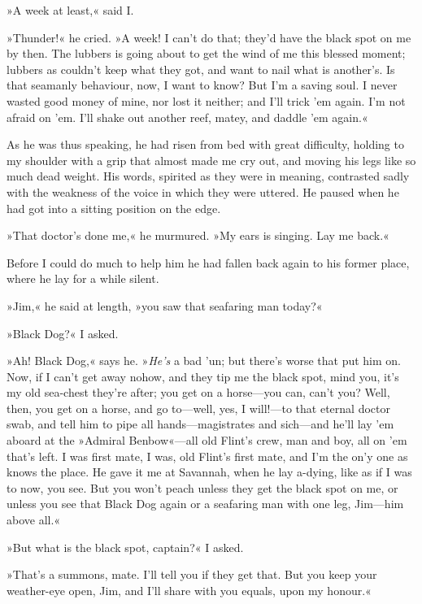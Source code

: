 »A week at least,« said I.

»Thunder!« he cried. »A week! I can't do that; they'd have the black spot on me by then. The lubbers is going about to get the wind of me this blessed moment; lubbers as couldn't keep what they got, and want to nail what is another's. Is that seamanly behaviour, now, I want to know? But I'm a saving soul. I never wasted good money of mine, nor lost it neither; and I'll trick 'em again. I'm not afraid on 'em. I'll shake out another reef, matey, and daddle 'em again.«

As he was thus speaking, he had risen from bed with great difficulty, holding to my shoulder with a grip that almost made me cry out, and moving his legs like so much dead weight. His words, spirited as they were in meaning, contrasted sadly with the weakness of the voice in which they were uttered. He paused when he had got into a sitting position on the edge.

»That doctor's done me,« he murmured. »My ears is singing. Lay me back.«

Before I could do much to help him he had fallen back again to his former place, where he lay for a while silent.

»Jim,« he said at length, »you saw that seafaring man today?«

»Black Dog?« I asked.

»Ah! Black Dog,« says he. »\textit{He's} a bad 'un; but there's worse that put him on. Now, if I can't get away nohow, and they tip me the black spot, mind you, it's my old sea-chest they're after; you get on a horse—you can, can't you? Well, then, you get on a horse, and go to—well, yes, I will!—to that eternal doctor swab, and tell him to pipe all hands—magistrates and sich—and he'll lay 'em aboard at the »Admiral Benbow«—all old Flint's crew, man and boy, all on 'em that's left. I was first mate, I was, old Flint's first mate, and I'm the on'y one as knows the place. He gave it me at Savannah, when he lay a-dying, like as if I was to now, you see. But you won't peach unless they get the black spot on me, or unless you see that Black Dog again or a seafaring man with one leg, Jim—him above all.«

»But what is the black spot, captain?« I asked.

»That's a summons, mate. I'll tell you if they get that. But you keep your weather-eye open, Jim, and I'll share with you equals, upon my honour.«

